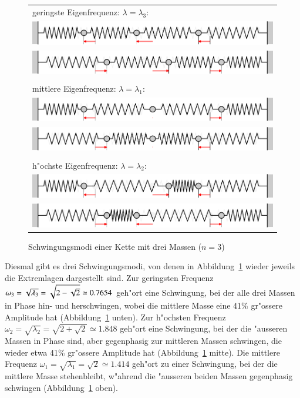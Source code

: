 \begin{figure}
\begin{center}
\begin{tabular}{l}
geringste Eigenfrequenz: $\lambda=\lambda_3$:\\
\includegraphics[width=\hsize]{images/e-8}\\
\includegraphics[width=\hsize]{images/e-9}\\
\\
mittlere Eigenfrequenz: $\lambda=\lambda_1$:\\
\includegraphics[width=\hsize]{images/e-6}\\
\includegraphics[width=\hsize]{images/e-7}\\
\\
h"ochste Eigenfrequenz: $\lambda=\lambda_2$:\\
\includegraphics[width=\hsize]{images/e-10}\\
\includegraphics[width=\hsize]{images/e-11}
\end{tabular}
\end{center}
\caption{Schwingungsmodi einer Kette mit drei Massen ($n=3$)\label{n3modi}}
\end{figure}%
Diesmal gibt es drei Schwingungsmodi, von denen in Abbildung~\ref{n3modi}
wieder jeweils die Extremlagen dargestellt sind. Zur geringsten Frequenz
$\omega_3=\sqrt{\mathstrut\lambda_3}=\sqrt{2-\sqrt{2\mathstrut}}\simeq 0.7654$
geh"ort eine Schwingung, bei der alle drei Massen in Phase
hin- und herschwingen, wobei die mittlere Masse eine 41\% 
gr"ossere Amplitude hat (Abbildung~\ref{n3modi} unten).
Zur h"ochsten Frequenz
$\omega_2=\sqrt{\lambda_2}=\sqrt{2+\sqrt{2}}\simeq 1.848$
geh"ort eine Schwingung, bei der die "ausseren Massen in Phase sind,
aber gegenphasig zur mittleren Massen schwingen, die wieder etwa
41\% gr"ossere Amplitude hat (Abbildung~\ref{n3modi} mitte).
Die mittlere Frequenz $\omega_1=\sqrt{\lambda_1}=\sqrt{2}\simeq 1.414$
geh"ort zu einer Schwingung, bei der die mittlere Masse stehenbleibt,
w"ahrend die "ausseren beiden Massen gegenphasig schwingen (Abbildung~\ref{n3modi} oben).


